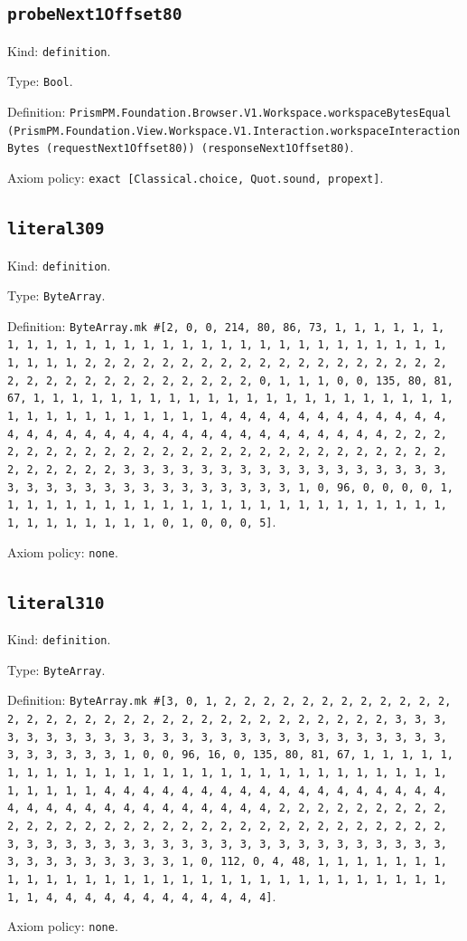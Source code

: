 \documentclass[11pt]{article}
\begin{document}
\subsection*{\texttt{probeNext1Offset80}}
\noindent Kind: \texttt{definition}.\par
\noindent Type: \texttt{Bool}.\par
\noindent Definition: \texttt{PrismPM.Foundation.Browser.V1.Workspace.workspaceBytesEqual (PrismPM.Foundation.View.Workspace.V1.Interaction.workspaceInteractionBytes (requestNext1Offset80)) (responseNext1Offset80)}.\par
\noindent Axiom policy: \texttt{exact [Classical.choice, Quot.sound, propext]}.\par
\subsection*{\texttt{literal309}}
\noindent Kind: \texttt{definition}.\par
\noindent Type: \texttt{ByteArray}.\par
\noindent Definition: \texttt{ByteArray.mk \#[2, 0, 0, 214, 80, 86, 73, 1, 1, 1, 1, 1, 1, 1, 1, 1, 1, 1, 1, 1, 1, 1, 1, 1, 1, 1, 1, 1, 1, 1, 1, 1, 1, 1, 1, 1, 1, 1, 1, 1, 2, 2, 2, 2, 2, 2, 2, 2, 2, 2, 2, 2, 2, 2, 2, 2, 2, 2, 2, 2, 2, 2, 2, 2, 2, 2, 2, 2, 2, 2, 2, 2, 0, 1, 1, 1, 0, 0, 135, 80, 81, 67, 1, 1, 1, 1, 1, 1, 1, 1, 1, 1, 1, 1, 1, 1, 1, 1, 1, 1, 1, 1, 1, 1, 1, 1, 1, 1, 1, 1, 1, 1, 1, 1, 1, 4, 4, 4, 4, 4, 4, 4, 4, 4, 4, 4, 4, 4, 4, 4, 4, 4, 4, 4, 4, 4, 4, 4, 4, 4, 4, 4, 4, 4, 4, 4, 4, 2, 2, 2, 2, 2, 2, 2, 2, 2, 2, 2, 2, 2, 2, 2, 2, 2, 2, 2, 2, 2, 2, 2, 2, 2, 2, 2, 2, 2, 2, 2, 2, 3, 3, 3, 3, 3, 3, 3, 3, 3, 3, 3, 3, 3, 3, 3, 3, 3, 3, 3, 3, 3, 3, 3, 3, 3, 3, 3, 3, 3, 3, 3, 3, 1, 0, 96, 0, 0, 0, 0, 1, 1, 1, 1, 1, 1, 1, 1, 1, 1, 1, 1, 1, 1, 1, 1, 1, 1, 1, 1, 1, 1, 1, 1, 1, 1, 1, 1, 1, 1, 1, 1, 0, 1, 0, 0, 0, 5]}.\par
\noindent Axiom policy: \texttt{none}.\par
\subsection*{\texttt{literal310}}
\noindent Kind: \texttt{definition}.\par
\noindent Type: \texttt{ByteArray}.\par
\noindent Definition: \texttt{ByteArray.mk \#[3, 0, 1, 2, 2, 2, 2, 2, 2, 2, 2, 2, 2, 2, 2, 2, 2, 2, 2, 2, 2, 2, 2, 2, 2, 2, 2, 2, 2, 2, 2, 2, 2, 2, 2, 3, 3, 3, 3, 3, 3, 3, 3, 3, 3, 3, 3, 3, 3, 3, 3, 3, 3, 3, 3, 3, 3, 3, 3, 3, 3, 3, 3, 3, 3, 3, 3, 1, 0, 0, 96, 16, 0, 135, 80, 81, 67, 1, 1, 1, 1, 1, 1, 1, 1, 1, 1, 1, 1, 1, 1, 1, 1, 1, 1, 1, 1, 1, 1, 1, 1, 1, 1, 1, 1, 1, 1, 1, 1, 1, 4, 4, 4, 4, 4, 4, 4, 4, 4, 4, 4, 4, 4, 4, 4, 4, 4, 4, 4, 4, 4, 4, 4, 4, 4, 4, 4, 4, 4, 4, 4, 4, 2, 2, 2, 2, 2, 2, 2, 2, 2, 2, 2, 2, 2, 2, 2, 2, 2, 2, 2, 2, 2, 2, 2, 2, 2, 2, 2, 2, 2, 2, 2, 2, 3, 3, 3, 3, 3, 3, 3, 3, 3, 3, 3, 3, 3, 3, 3, 3, 3, 3, 3, 3, 3, 3, 3, 3, 3, 3, 3, 3, 3, 3, 3, 3, 1, 0, 112, 0, 4, 48, 1, 1, 1, 1, 1, 1, 1, 1, 1, 1, 1, 1, 1, 1, 1, 1, 1, 1, 1, 1, 1, 1, 1, 1, 1, 1, 1, 1, 1, 1, 1, 1, 4, 4, 4, 4, 4, 4, 4, 4, 4, 4, 4, 4]}.\par
\noindent Axiom policy: \texttt{none}.\par
\end{document}
